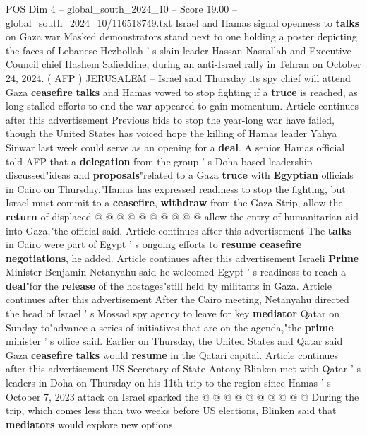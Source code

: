 \begin{textsample}{POS Dim 4 – global\_south\_2024\_10 – Score 19.00 – global\_south\_2024\_10/116518749.txt}  \label{ex:f4_pos_395}
Israel and Hamas signal openness to \textbf{talks} on Gaza war Masked demonstrators stand next to one holding a poster depicting the faces of Lebanese Hezbollah ' s slain leader Hassan Nasrallah and Executive Council chief Hashem Safieddine, during an anti-Israel rally in Tehran on October 24, 2024. ( AFP ) JERUSALEM -- Israel said Thursday its spy chief will attend Gaza \textbf{ceasefire} \textbf{talks} and Hamas vowed to stop fighting if a \textbf{truce} is reached, as long-stalled efforts to end the war appeared to gain momentum.
Article continues after this advertisement Previous bids to stop the year-long war have failed, though the United States has voiced hope the killing of Hamas leader Yahya Sinwar last week could serve as an opening for a \textbf{deal}.
A senior Hamas official told AFP that a \textbf{delegation} from the group ' s Doha-based leadership discussed"ideas and \textbf{proposals}"related to a Gaza \textbf{truce} with \textbf{Egyptian} officials in Cairo on Thursday."Hamas has expressed readiness to stop the fighting, but Israel must commit to a \textbf{ceasefire}, \textbf{withdraw} from the Gaza Strip, allow the \textbf{return} of displaced @ @ @ @ @ @ @ @ @ @ allow the entry of humanitarian aid into Gaza,"the official said.
Article continues after this advertisement The \textbf{talks} in Cairo were part of Egypt ' s ongoing efforts to \textbf{resume} \textbf{ceasefire} \textbf{negotiations}, he added.
Article continues after this advertisement Israeli \textbf{Prime} Minister Benjamin Netanyahu said he welcomed Egypt ' s readiness to reach a \textbf{deal}"for the \textbf{release} of the hostages"still held by militants in Gaza.
Article continues after this advertisement After the Cairo meeting, Netanyahu directed the head of Israel ' s Mossad spy agency to leave for key \textbf{mediator} Qatar on Sunday to"advance a series of initiatives that are on the agenda,"the \textbf{prime} minister ' s office said.
Earlier on Thursday, the United States and Qatar said Gaza \textbf{ceasefire} \textbf{talks} would \textbf{resume} in the Qatari capital.
Article continues after this advertisement US Secretary of State Antony Blinken met with Qatar ' s leaders in Doha on Thursday on his 11th trip to the region since Hamas ' s October 7, 2023 attack on Israel sparked the @ @ @ @ @ @ @ @ @ @ During the trip, which comes less than two weeks before US elections, Blinken said that \textbf{mediators} would explore new options.

\end{textsample}
